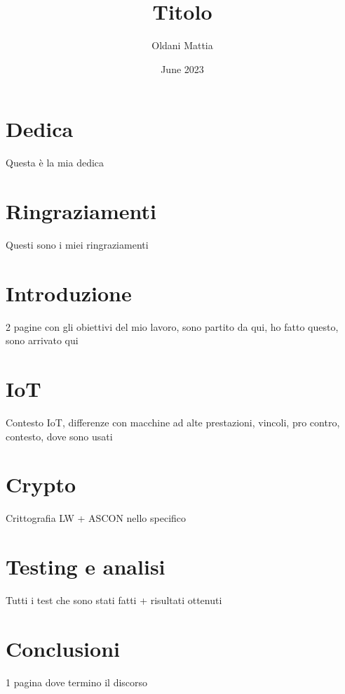 \documentclass{report}
\title{Titolo}
\author{Oldani Mattia}
\date{June 2023}
\begin{document}
\maketitle

\chapter*{Dedica}
Questa è la mia dedica

\newpage

\chapter*{Ringraziamenti}
Questi sono i miei ringraziamenti

\tableofcontents
\newpage

\chapter{Introduzione}
2 pagine con gli obiettivi del mio lavoro, sono partito da qui, ho fatto questo, sono arrivato qui
\newpage

\chapter{IoT}
Contesto IoT, differenze con macchine ad alte prestazioni, vincoli, pro contro, contesto, dove sono usati
\newpage

\chapter{Crypto}
Crittografia LW + ASCON nello specifico
\newpage

\chapter{Testing e analisi}
Tutti i test che sono stati fatti + risultati ottenuti
\newpage

\chapter{Conclusioni}
1 pagina dove termino il discorso
\newpage
\end{document}
